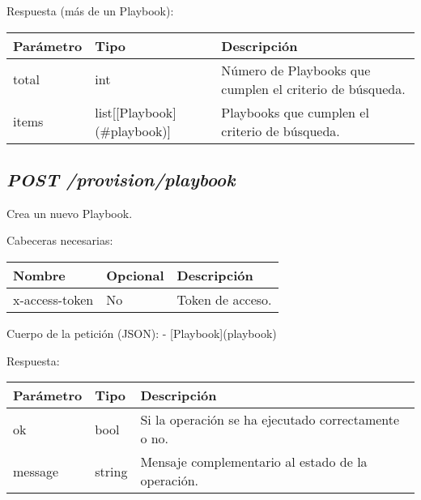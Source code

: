 		Respuesta (más de un Playbook):
		\begin{table}[h!]
			\centering
	\begin{adjustbox}{max width=\textwidth}
			\begin{tabular}{|l|l|l|}
				\hline
				Parámetro & Tipo & Descripción \\ \hline
				total & int & Número de Playbooks que cumplen el criterio de búsqueda. \\ \hline
				items & list[[Playbook](\#playbook)] & Playbooks que cumplen el criterio de búsqueda. \\ \hline
			\end{tabular}
\end{adjustbox}
		\end{table}
	
	
	
	\subsection{\textit{POST /provision/playbook}}
		Crea un nuevo Playbook.
		
		Cabeceras necesarias:
		\begin{table}[h!]
			\centering
	\begin{adjustbox}{max width=\textwidth}
			\begin{tabular}{|l|l|l|}
				\hline
				Nombre & Opcional & Descripción \\ \hline
				x-access-token & No & Token de acceso. \\ \hline
			\end{tabular}
\end{adjustbox}
		\end{table}
		
		Cuerpo de la petición (JSON):
		- [Playbook](playbook)
		
		Respuesta:
		\begin{table}[!h]
			\centering
	\begin{adjustbox}{max width=\textwidth}
			\begin{tabular}{|l|l|l|}
				\hline
				Parámetro & Tipo & Descripción \\ \hline
				ok & bool & Si la operación se ha ejecutado correctamente o no. \\ \hline
				message & string & Mensaje complementario al estado de la operación. \\ \hline
			\end{tabular}
\end{adjustbox}
	\end{table}
	
